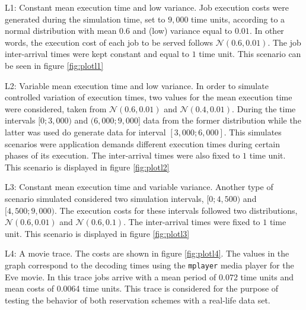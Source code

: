 \documentclass[times, 10pt,twocolumn]{article}
\begin{document}
\begin{description}
\item L1: Constant mean execution time and low variance. Job execution
  costs were generated during the simulation time, set to $9,000$ time
  units, according to a normal distribution with mean $0.6$ and (low)
  variance equal to $0.01$. In other words, the execution cost of each
  job to be served follows $\mathcal{N}(0.6,0.01)$. The job
  inter-arrival times were kept constant and equal to $1$ time
  unit. This scenario can be seen in figure \ref{fig:plotl1}
\item L2: Variable mean execution time and low variance.  In order to
  simulate controlled variation of execution times, two values for the
  mean execution time were considered, taken from
  $\mathcal{N}(0.6,0.01)$ and $\mathcal{N}(0.4,0.01)$. During the time
  intervals $[0;3,000)$ and $(6,000;9,000]$ data from the former
  distribution while the latter was used do generate data for interval
  $[3,000;6,000]$. This simulates scenarios were application demands
  different execution times during certain phases of its
  execution. The inter-arrival times were also fixed to $1$ time
  unit. This scenario is displayed in figure \ref{fig:plotl2}
\item L3: Constant mean execution time and variable variance.  Another
  type of scenario simulated considered two simulation intervals,
  $[0;4,500)$ and $[4,500;9,000)$.  The execution costs for these
  intervals followed two distributions, $\mathcal{N}(0.6,0.01)$ and
  $\mathcal{N}(0.6,0.1)$. The inter-arrival times were fixed to $1$
  time unit. This scenario is displayed in figure \ref{fig:plotl3}
\item L4: A movie trace. The costs are shown in figure
  \ref{fig:plotl4}. The values in the graph correspond to the
  decoding times using the \texttt{mplayer} media player for the Eve
  movie. In this trace jobs arrive with a mean period of 0.072 time
  units and mean costs of 0.0064 time units. This trace is considered
  for the purpose of testing the behavior of both reservation schemes
  with a real-life data set.
\end{description}
\end{document}

